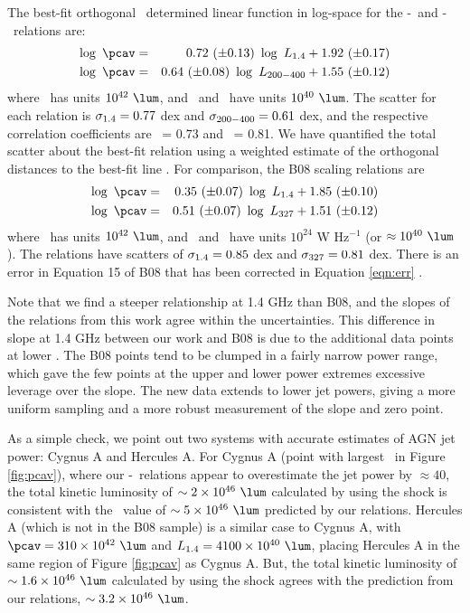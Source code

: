 \documentclass{emulateapj}
\begin{document}
The best-fit orthogonal \bces\ determined linear function in log-space
for the \pcav-\phigh\ and \pcav-\plow\ relations are:
\begin{eqnarray}
  \log~\pcav &=& 0.72~(\pm 0.13)~\log~\phigh + 1.92~(\pm 0.17) \label{eqn:high}\\
  \log~\pcav &=& 0.64~(\pm 0.08)~\log~\plow + 1.55~(\pm 0.12) \label{eqn:low}
\end{eqnarray}
where \pcav\ has units $10^{42} ~\lum$, and \phigh\ and \plow\ have
units $10^{40} ~\lum$. The scatter for each relation is $\sigma_{\mathrm{1.4}} = 0.77$
dex and $\sigma_{\mathrm{200-400}} = 0.61$ dex, and the respective correlation
coefficients are \rhigh\ = 0.73 and \rlow\ = 0.81. We have quantified
the total scatter about the best-fit relation using a weighted
estimate of the orthogonal distances to the best-fit line
\citep[see][for equations]{2009A&A...498..361P}. For comparison, the
B08 scaling relations are
\begin{eqnarray}
  \log~\pcav &=& 0.35~(\pm 0.07)~\log~\phigh + 1.85~(\pm 0.10) \\
  \log~\pcav &=& 0.51~(\pm 0.07)~\log~\pthree + 1.51~(\pm 0.12) \label{eqn:err}
\end{eqnarray}
where \pcav\ has units $10^{42} ~\lum$, and \phigh\ and \pthree\ have
units $10^{24}$ W Hz$^{-1}$ (or $\approx 10^{40} ~\lum$). The relations
have scatters of $\sigma_{\mathrm{1.4}} = 0.85$ dex and $\sigma_{\mathrm{327}} = 0.81$ dex. There
is an error in Equation 15 of B08 that has been corrected in Equation
\ref{eqn:err} \citep{birzan08err}.

Note that we find a steeper relationship at 1.4 GHz than B08, and the
slopes of the relations from this work agree within the
uncertainties. This difference in slope at 1.4 GHz between our work
and B08 is due to the additional data points at lower \pjet. The B08
points tend to be clumped in a fairly narrow power range, which gave
the few points at the upper and lower power extremes excessive
leverage over the slope. The new data extends to lower jet powers,
giving a more uniform sampling and a more robust measurement of the
slope and zero point.

As a simple check, we point out two systems with accurate estimates of
AGN jet power: Cygnus A and Hercules A. For Cygnus A (point with
largest \prad\ in Figure \ref{fig:pcav}), where our
\pjet-\prad\ relations appear to overestimate the jet power by
$\approx 40$, the total kinetic luminosity of $\sim 2\times10^{46}
~\lum$ calculated by \citet{2006ApJ...644L...9W} using the shock is
consistent with the \pjet\ value of $\sim 5\times10^{46} ~\lum$
predicted by our relations. Hercules A (which is not in the B08
sample) is a similar case to Cygnus A, with $\pcav = 310\times10^{42}
~\lum$ and $\phigh = 4100\times10^{40} ~\lum$, placing Hercules A in the
same region of Figure \ref{fig:pcav} as Cygnus A. But, the total
kinetic luminosity of $\sim 1.6\times10^{46} ~\lum$ calculated by
\citet{herca} using the shock agrees with the prediction from our
relations, $\sim 3.2\times10^{46} ~\lum$.
\end{document}
